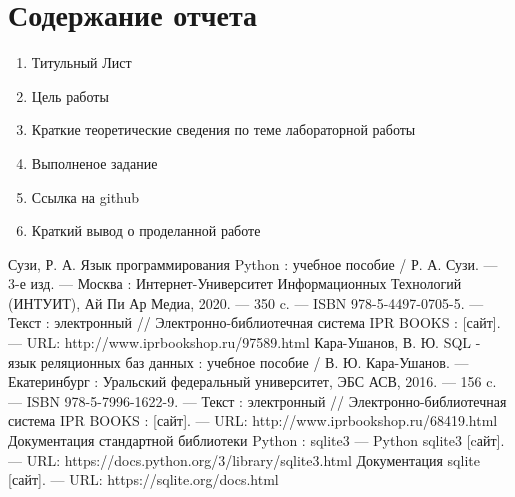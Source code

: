 \documentclass[a4paper]{article}
\begin{document}
\section{Содержание отчета}
\begin{enumerate}
  \item Титульный Лист
  \item Цель работы
  \item Краткие теоретические сведения по теме лабораторной работы
  \item Выполненое задание
  \item Ссылка на github
  \item Краткий вывод о проделанной работе
\end{enumerate}

\begin{thebibliography}{3}
  Сузи, Р. А. Язык программирования Python : учебное пособие / Р. А. Сузи. — 3-е изд. — Москва : Интернет-Университет Информационных Технологий (ИНТУИТ), Ай Пи Ар Медиа, 2020. — 350 c. — ISBN 978-5-4497-0705-5. — Текст : электронный // Электронно-библиотечная система IPR BOOKS : [сайт]. — URL: http://www.iprbookshop.ru/97589.html
  Кара-Ушанов, В. Ю. SQL - язык реляционных баз данных : учебное пособие / В. Ю. Кара-Ушанов. — Екатеринбург : Уральский федеральный университет, ЭБС АСВ, 2016. — 156 c. — ISBN 978-5-7996-1622-9. — Текст : электронный // Электронно-библиотечная система IPR BOOKS : [сайт]. — URL: http://www.iprbookshop.ru/68419.html 
   Документация стандартной библиотеки Python : sqlite3 — Python sqlite3 [cайт]. --- URL: https://docs.python.org/3/library/sqlite3.html
   Документация sqlite [сайт]. --- URL: https://sqlite.org/docs.html
\end{thebibliography}
\end{document}
